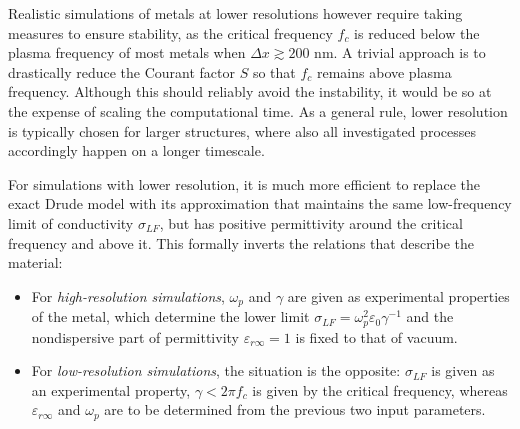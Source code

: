 Realistic simulations of metals at lower resolutions however require taking measures to ensure stability, as the critical frequency $f_c$ is reduced below the plasma frequency of most metals when $\Delta x \gtrsim 200$ nm. %
A trivial approach is to drastically reduce the Courant factor $S$ so that $f_c$ remains above plasma frequency. Although this should reliably avoid the instability, it would be so at the expense of scaling the computational time. As a general rule, lower resolution is typically chosen for larger structures, where also all investigated processes accordingly happen on a longer timescale.

For simulations with lower resolution, it is much more efficient to replace the exact Drude model with its approximation that maintains the same low-frequency limit of conductivity $\sigma_{LF}$, but has positive permittivity around the critical frequency and above it. 
This formally inverts the relations that describe the material:
\begin{itemize}
\item{
For \textit{high-resolution simulations}, $\omega_p$ and $\gamma$ are given as experimental properties of the metal, which determine the lower limit $\sigma_{LF} = \omega_p^2\varepsilon_0\gamma^{-1}$ and the nondispersive part of permittivity $\varepsilon_{r\infty} = 1$ is fixed to that of vacuum. 
} 
\item{
For \textit{low-resolution simulations}, the situation is the opposite: $\sigma_{LF}$ is given as an experimental property, $\gamma < 2\pi f_c$ is given by the critical frequency, %
whereas $\varepsilon_{r\infty}$ and $\omega_p$ are to be determined from the previous two input parameters.
} 
\end{itemize}

